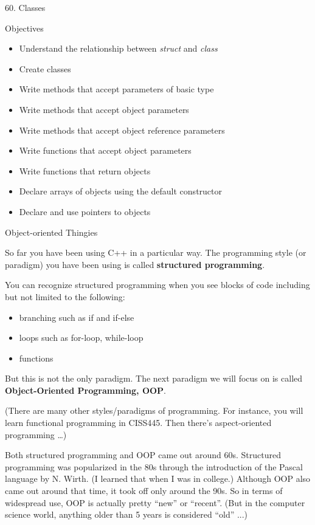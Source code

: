 \documentclass[
]{article}
\author{}
\date{}
\providecommand{\tightlist}{%
  \setlength{\itemsep}{0pt}\setlength{\parskip}{0pt}}
\begin{document}
60. Classes

Objectives

\begin{itemize}
\tightlist
\item
  Understand the relationship between \emph{struct} and \emph{class}
\item
  Create classes
\item
  Write methods that accept parameters of basic type
\item
  Write methods that accept object parameters
\item
  Write methods that accept object reference parameters
\item
  Write functions that accept object parameters
\item
  Write functions that return objects
\item
  Declare arrays of objects using the default constructor
\item
  Declare and use pointers to objects
\end{itemize}

Object-oriented Thingies

So far you have been using C++ in a particular way. The programming
style (or paradigm) you have been using is called \textbf{structured
programming}.

You can recognize structured programming when you see blocks of code
including but not limited to the following:

\begin{itemize}
\tightlist
\item
  branching such as if and if-else
\item
  loops such as for-loop, while-loop
\item
  functions
\end{itemize}

But this is not the only paradigm. The next paradigm we will focus on is
called \textbf{Object-Oriented Programming, OOP}.

(There are many other styles/paradigms of programming. For instance, you
will learn functional programming in CISS445. Then there's
aspect-oriented programming \ldots)

Both structured programming and OOP came out around 60s. Structured
programming was popularized in the 80s through the introduction of the
Pascal language by N. Wirth. (I learned that when I was in college.)
Although OOP also came out around that time, it took off only around the
90s. So in terms of widespread use, OOP is actually pretty ``new'' or
``recent''. (But in the computer science world, anything older than 5
years is considered ``old'' ...)
\end{document}
